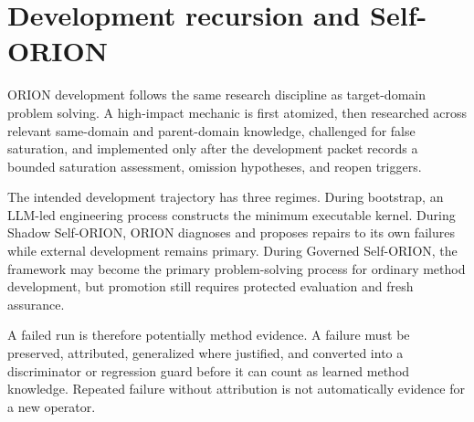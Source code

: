 \section{Development recursion and Self-ORION}

ORION development follows the same research discipline as target-domain problem solving. A high-impact mechanic is first atomized, then researched across relevant same-domain and parent-domain knowledge, challenged for false saturation, and implemented only after the development packet records a bounded saturation assessment, omission hypotheses, and reopen triggers.

The intended development trajectory has three regimes. During bootstrap, an LLM-led engineering process constructs the minimum executable kernel. During Shadow Self-ORION, ORION diagnoses and proposes repairs to its own failures while external development remains primary. During Governed Self-ORION, the framework may become the primary problem-solving process for ordinary method development, but promotion still requires protected evaluation and fresh assurance.

A failed run is therefore potentially method evidence. A failure must be preserved, attributed, generalized where justified, and converted into a discriminator or regression guard before it can count as learned method knowledge. Repeated failure without attribution is not automatically evidence for a new operator.
